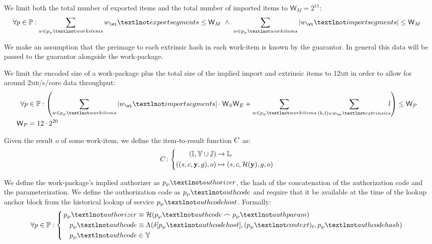 We limit both the total number of exported items and the total number of imported items to $\mathsf{W}_M = 2^{11}$:
\begin{equation}
  \forall \wpX \in \mathbb{P}:
  \sum_{\wiX \in \wpX_\wp¬workitems} \wiX_\wi¬exportsegments \le \mathsf{W}_M \ \wedge\ 
  \sum_{\wiX \in \wpX_\wp¬workitems} |\wiX_\wi¬importsegments| \le \mathsf{W}_M
\end{equation}

We make an assumption that the preimage to each extrinsic hash in each work-item is known by the guarantor. In general this data will be passed to the guarantor alongside the work-package.

We limit the encoded size of a work-package plus the total size of the implied import and extrinsic items to 12\textsc{mb} in order to allow for around 2\textsc{mb}/s/core data throughput:
\begin{align}
  \label{eq:checkextractsize}
  \forall \wpX &\in \mathbb{P}: \left(
  \sum_{\wiX \in \wpX_\wp¬workitems} |\wiX_\wi¬importsegments|\cdot\mathsf{W}_S\mathsf{W}_E + \sum_{\wiX \in \wpX_\wp¬workitems} \sum_{(h, l) \in \wiX_\wi¬extrinsics} \!\!\!l\right) \le \mathsf{W}_P \\
  \mathsf{W}_P &= 12\cdot2^{20}
\end{align}


Given the result $o$ of some work-item, we define the item-to-result function $C$ as:
\begin{equation}
  \itemtoresult\colon\left\{\begin{aligned}
    (\mathbb{I}, \Y \cup \mathbb{J}) &\to \mathbb{L}\\
    ((s, c, \mathbf{y}, g), o) &\mapsto (s, c, \mathcal{H}(\mathbf{y}), g, o)
  \end{aligned}\right.
\end{equation}

We define the work-package's implied authorizer as $\wpX_\wp¬authorizer$, the hash of the concatenation of the authorization code and the parameterization. We define the authorization code as $\wpX_\wp¬authcode$ and require that it be available at the time of the lookup anchor block from the historical lookup of service $\wpX_\wp¬authcodehost$. Formally:
\begin{equation}
  \forall \wpX \in \mathbb{P}: \left\{\,\begin{aligned}
    \wpX_\wp¬authorizer &\equiv \mathcal{H}(\wpX_\wp¬authcode \concat \wpX_\wp¬authparam) \\
    \wpX_\wp¬authcode &\equiv \Lambda(\delta[\wpX_\wp¬authcodehost], (\wpX_\wp¬context)_t, \wpX_\wp¬authcodehash) \\
    \wpX_\wp¬authcode &\in \Y
  \end{aligned}\right.
\end{equation}

